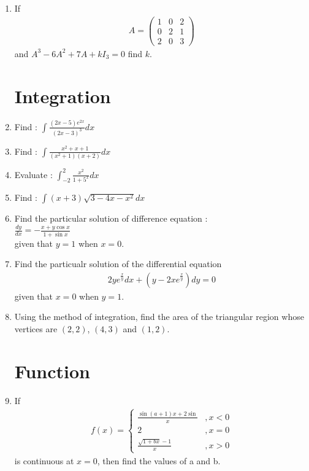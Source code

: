 \documentclass[12pt,-letter paper]{article}
\newcommand{\myvec}[1]{\ensuremath{\begin{pmatrix}#1\end{pmatrix}}}
\begin{document}
\begin{enumerate}
	\item If 
	\begin{align}
		A = \myvec{1 & 0 & 2\\
		0 & 2 & 1 \\
		2 & 0 & 3}
	\end{align}
and $A^3-6A^2+7A+kI_3=0$ find $k$.


\section{Integration}
	\item Find : $\int \frac{(2x-5)e^{2x}}{(2x-3)^3} dx$

	\item Find : $\int \frac{x^2 +x +1}{(x^2 + 1)(x + 2)} dx$

	\item Evaluate : $\int_{-2}^{2} \frac{x^2}{1+5^x} dx$

	\item Find : $\int (x+3)\sqrt{3 - 4x - x^2} dx$\\

	\item Find the particular solution of difference equation :\\
 $\frac{dy}{dx} = - \frac{x + y\cos x}{1 + \sin x}$ \\
 given that $y = 1$ when $x = 0$.

	\item Find the particualr solution of the differential equation
	\begin{align}
		2y e^{\frac{x}{y}} dx + (y -2x e^{\frac{x}{y}}) dy = 0
	\end{align}
given that $x = 0$ when $y = 1$.

	\item Using the method of integration, find the area of the triangular region whose vertices are $(2, 2)$, $(4, 3)$ and $(1, 2)$.


\section{Function}
	\item If 
	\begin{align}
		f(x) = 
		\begin{cases}
			\frac{\sin(a+1)x + 2\sin}{x} &,x<0 \\
			2 &,x = 0\\
			\frac{\sqrt{1+bx}-1}{x} &,x>0
		\end{cases}
	\end{align}
is continuous at $x = 0$, then find the values of a and b.


\end{enumerate}
\end{document}
